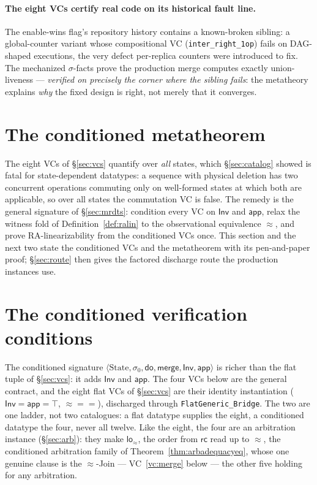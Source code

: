 \documentclass[11pt]{article}
\newcommand{\rcrel}{\mathsf{rc}}                 %
\newcommand{\lean}[1]{\texttt{#1}}
\newcommand{\st}{\sigma}
\newcommand{\ini}{\st_0}
\newcommand{\dodo}{\mathsf{do}}
\newcommand{\merge}{\mathsf{merge}}
\newcommand{\eqobs}{\approx}
\newcommand{\Inv}{\mathsf{Inv}}
\newcommand{\app}{\mathsf{app}}
\begin{document}
\paragraph{The eight VCs certify real code on its historical fault
line.} The enable-wins flag's repository history contains a
known-broken sibling: a global-counter variant whose compositional VC
(\lean{inter\_right\_1op}) fails on DAG-shaped executions, the very defect
per-replica counters were introduced to fix. The mechanized $\sigma$-facts
prove the production merge computes exactly union-liveness ---
\emph{verified on precisely the corner where the sibling fails}: the
metatheory explains \emph{why} the fixed design is right, not merely that
it converges.


\section{The conditioned metatheorem}
\label{sec:condmeta}

The eight VCs of \S\ref{sec:vcs} quantify over \emph{all} states, which
\S\ref{sec:catalog} showed is fatal for state-dependent datatypes: a
sequence with physical deletion has two concurrent operations commuting
only on well-formed states at which both are applicable, so over all
states the commutation VC is false. The remedy is the general signature
of \S\ref{sec:mrdts}: condition every VC on $\Inv$ and $\app$, relax the
witness fold of Definition~\ref{def:ralin} to the observational
equivalence $\eqobs$, and prove RA-linearizability from the conditioned
VCs once. This section and the next two state the conditioned VCs and
the metatheorem with its pen-and-paper proof; \S\ref{sec:route} then
gives the factored discharge route the production instances use.

\section{The conditioned verification conditions}\label{sec:cvcs}

The conditioned signature
$\langle \text{State}, \ini, \dodo, \merge, \Inv, \app \rangle$ is richer
than the flat tuple of \S\ref{sec:vcs}: it adds $\Inv$ and $\app$. The
four VCs below are the general contract, and the eight flat VCs of
\S\ref{sec:vcs} are their identity instantiation
($\Inv = \app = \top$, ${\eqobs} = {=}$), discharged through
\lean{FlatGeneric\_Bridge}. The two are one ladder, not two catalogues: a
flat datatype supplies the eight, a conditioned datatype the four, never
all twelve. Like the eight, the four are an arbitration instance
(\S\ref{sec:arb}): they make $\mathsf{lo}_{\eqobs}$, the order from
$\rcrel$ read up to $\eqobs$, the conditioned arbitration family of
Theorem~\ref{thm:arbadequacyeq}, whose one genuine clause is the
$\eqobs$-Join --- VC~\ref{vc:merge} below --- the other five holding for
any arbitration.
\end{document}
